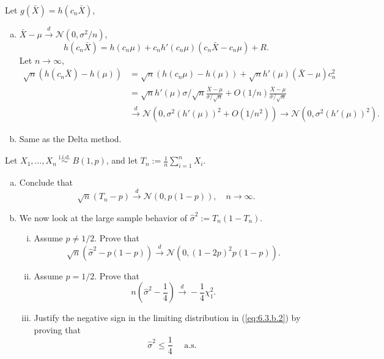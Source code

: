 \begin{solution}
    Let $g(\bar{X})=h(c_n\bar{X})$, 
    \begin{enumerate}[(a)]
        \item $\bar{X}-\mu\stackrel{d}{\rightarrow} \mathcal{N}(0, \sigma^2/n)$, 
        \[
            h(c_n\bar{X})=h(c_n\mu)+c_nh'(c_n\mu)(c_n\bar{X}-c_n\mu)+R.
        \]
        Let $n\to\infty$, 
        \[
            \begin{aligned}
                \sqrt{n}(h(c_n\bar{X})-h(\mu))&=\sqrt{n}(h(c_n\mu)-h(\mu))+\sqrt{n}h'(\mu)(\bar{X}-\mu)c_n^2\\
                & =\sqrt{n}h'(\mu)\sigma/\sqrt{n}\frac{\bar{X}-\mu}{\sigma/\sqrt{n}}+O(1/n)\frac{\bar{X}-\mu}{\sigma/\sqrt{n}}\\
                &\stackrel{d}{\rightarrow} \mathcal{N}(0,\sigma^2(h'(\mu))^2+O(1/n^2))\to \mathcal{N}(0,\sigma^2(h'(\mu))^2). 
            \end{aligned}
        \]
        \item Same as the Delta method. 
    \end{enumerate}
\end{solution}

\begin{ex}
    Let \(X_{1}, \ldots, X_{n} \stackrel{\text { i.i.d. }}{\sim} B(1, p)\), and let \(T_{n}:=\frac{1}{n} \sum_{i=1}^{n} X_{i}\). 
    \begin{enumerate}[(a)]
        \item Conclude that
        \[
            \sqrt{n}\left(T_{n}-p\right) \stackrel{d}{\rightarrow} \mathcal{N}(0, p(1-p)), \quad n \rightarrow \infty. 
        \]
        \item We now look at the large sample behavior of \(\widehat{\sigma}^{2}:=T_{n}\left(1-T_{n}\right)\). 
        \begin{enumerate}[(i)]
            \item Assume \(p \neq 1 / 2\). Prove that
            \[
                \sqrt{n}\left(\widehat{\sigma}^{2}-p(1-p)\right) \stackrel{d}{\rightarrow} \mathcal{N}\left(0,(1-2 p)^{2} p(1-p)\right). 
            \]
            \item Assume \(p=1 / 2\). Prove that
            \begin{equation}
                \label{eq:6.3.b.2}
                n\left(\widehat{\sigma}^{2}-\frac{1}{4}\right) \stackrel{d}{\rightarrow}-\frac{1}{4} \chi_{1}^{2}. 
            \end{equation}
            \item Justify the negative sign in the limiting distribution in (\ref{eq:6.3.b.2}) by proving that
            \[
                \widehat{\sigma}^{2} \leq \frac{1}{4} \quad \text { a.s. }
            \]
        \end{enumerate}
    \end{enumerate}
\end{ex}

